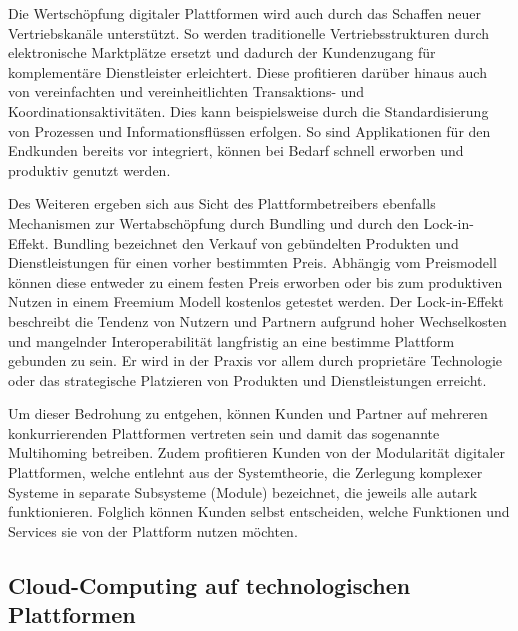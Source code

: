 Die Wertschöpfung digitaler Plattformen wird auch durch das Schaffen neuer Vertriebskanäle unterstützt. So werden traditionelle Vertriebsstrukturen durch elektronische Marktplätze ersetzt und dadurch der Kundenzugang für komplementäre Dienstleister erleichtert. Diese profitieren darüber hinaus auch von vereinfachten und vereinheitlichten Transaktions- und Koordinationsaktivitäten. Dies kann beispielsweise durch die Standardisierung von Prozessen und Informationsflüssen erfolgen. So sind Applikationen für den Endkunden bereits vor integriert, können bei Bedarf schnell erworben und produktiv genutzt werden.\autocite[Vgl.][S. 599f.]{HAHN2016}

Des Weiteren ergeben sich aus Sicht des Plattformbetreibers ebenfalls Mechanismen zur Wertabschöpfung durch Bundling und durch den Lock-in-Effekt. Bundling bezeichnet den Verkauf von gebündelten Produkten und Dienstleistungen für einen vorher bestimmten Preis. Abhängig vom Preismodell können diese entweder zu einem festen Preis erworben oder bis zum produktiven Nutzen in einem Freemium Modell kostenlos getestet werden.\autocite[Vgl.][S. 178-185]{TEECE2010} Der Lock-in-Effekt beschreibt die Tendenz von Nutzern und Partnern aufgrund hoher Wechselkosten und mangelnder Interoperabilität langfristig an eine bestimme Plattform gebunden zu sein. \autocite[Vgl.][S. 22]{STEUR2022} Er wird in der Praxis vor allem durch proprietäre Technologie oder das strategische Platzieren von Produkten und Dienstleistungen erreicht. \autocite[Vgl.][S. 704]{BALLON2011}

Um dieser Bedrohung zu entgehen, können Kunden und Partner auf mehreren konkurrierenden Plattformen vertreten sein und damit das sogenannte Multihoming betreiben. \autocite[Vgl.][S. 461ff]{CENNAMO2018} Zudem profitieren Kunden von der Modularität digitaler Plattformen, welche entlehnt aus der Systemtheorie, die Zerlegung komplexer Systeme in separate Subsysteme (Module) bezeichnet, die jeweils alle autark funktionieren. \autocite[Vgl.][S. 2]{LECHNER2019} Folglich können Kunden selbst entscheiden, welche Funktionen und Services sie von der Plattform nutzen möchten.


\subsection{Cloud-Computing auf technologischen Plattformen}\label{sec:TechPCloud}


